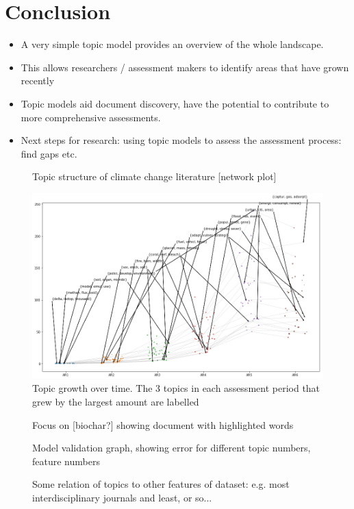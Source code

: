\documentclass{article}
\begin{document}
\section{Conclusion}
\begin{itemize}
	\item A very simple topic model provides an overview of the whole landscape.
    \item This allows researchers / assessment makers to identify areas that have grown recently
    \item Topic models aid document discovery, have the potential to contribute to more comprehensive assessments.
    \item Next steps for research: using topic models to assess the assessment process: find gaps etc.
\end{itemize}

\begin{figure}
    \caption{Topic structure of climate change literature [network plot]}
\end{figure}

\begin{figure}
	\includegraphics[width=\linewidth]{plots/hot_topics}
    \caption{Topic growth over time. The 3 topics in each assessment period that grew by the largest amount are labelled}
\end{figure}

\begin{figure}
    \caption{Focus on [biochar?] showing document with highlighted words}
\end{figure}

\begin{figure}
    \caption{Model validation graph, showing error for different topic numbers, feature numbers}
\end{figure}


\begin{figure}
    \caption{Some relation of topics to other features of dataset: e.g. most interdisciplinary journals and least, or so...}
\end{figure}



\listoffigures



\end{document}

